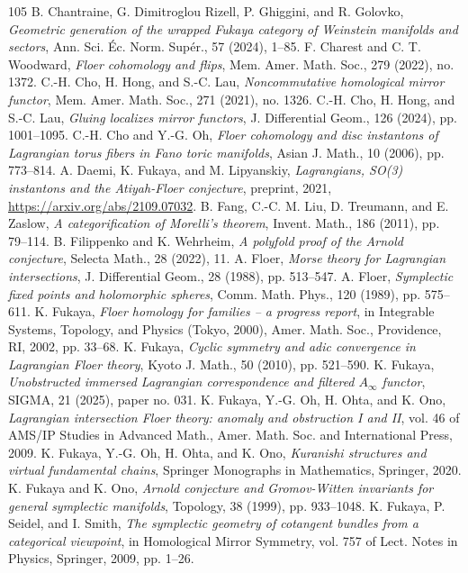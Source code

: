 \documentclass[UTF8,a4paper,11pt,fontset=windows]{ctexart}
\theoremstyle{cnthm}
\numberwithin{equation}{section}
\begin{document}
\begin{thebibliography}{105}
 B. Chantraine, G. Dimitroglou Rizell, P. Ghiggini, and R. Golovko, \emph{Geometric generation of the wrapped Fukaya category of Weinstein manifolds and sectors}, Ann. Sci. \'Ec. Norm. Sup\'er., 57 (2024), 1--85.
 F. Charest and C. T. Woodward, \emph{Floer cohomology and flips}, Mem. Amer. Math. Soc., 279 (2022), no. 1372.
 C.-H. Cho, H. Hong, and S.-C. Lau, \emph{Noncommutative homological mirror functor}, Mem. Amer. Math. Soc., 271 (2021), no. 1326.
 C.-H. Cho, H. Hong, and S.-C. Lau, \emph{Gluing localizes mirror functors}, J. Differential Geom., 126 (2024), pp. 1001--1095.
 C.-H. Cho and Y.-G. Oh, \emph{Floer cohomology and disc instantons of Lagrangian torus fibers in Fano toric manifolds}, Asian J. Math., 10 (2006), pp. 773--814.
 A. Daemi, K. Fukaya, and M. Lipyanskiy, \emph{Lagrangians, SO(3) instantons and the Atiyah-Floer conjecture}, preprint, 2021, \url{https://arxiv.org/abs/2109.07032}.
 B. Fang, C.-C. M. Liu, D. Treumann, and E. Zaslow, \emph{A categorification of Morelli's theorem}, Invent. Math., 186 (2011), pp. 79--114.
 B. Filippenko and K. Wehrheim, \emph{A polyfold proof of the Arnold conjecture}, Selecta Math., 28 (2022), 11.
 A. Floer, \emph{Morse theory for Lagrangian intersections}, J. Differential Geom., 28 (1988), pp. 513--547.
 A. Floer, \emph{Symplectic fixed points and holomorphic spheres}, Comm. Math. Phys., 120 (1989), pp. 575--611.
 K. Fukaya, \emph{Floer homology for families -- a progress report}, in Integrable Systems, Topology, and Physics (Tokyo, 2000), Amer. Math. Soc., Providence, RI, 2002, pp. 33--68.
 K. Fukaya, \emph{Cyclic symmetry and adic convergence in Lagrangian Floer theory}, Kyoto J. Math., 50 (2010), pp. 521--590.
 K. Fukaya, \emph{Unobstructed immersed Lagrangian correspondence and filtered $A_\infty$ functor}, SIGMA, 21 (2025), paper no. 031.
 K. Fukaya, Y.-G. Oh, H. Ohta, and K. Ono, \emph{Lagrangian intersection Floer theory: anomaly and obstruction I and II}, vol. 46 of AMS/IP Studies in Advanced Math., Amer. Math. Soc. and International Press, 2009.
 K. Fukaya, Y.-G. Oh, H. Ohta, and K. Ono, \emph{Kuranishi structures and virtual fundamental chains}, Springer Monographs in Mathematics, Springer, 2020.
 K. Fukaya and K. Ono, \emph{Arnold conjecture and Gromov-Witten invariants for general symplectic manifolds}, Topology, 38 (1999), pp. 933--1048.
 K. Fukaya, P. Seidel, and I. Smith, \emph{The symplectic geometry of cotangent bundles from a categorical viewpoint}, in Homological Mirror Symmetry, vol. 757 of Lect. Notes in Physics, Springer, 2009, pp. 1--26.

\end{thebibliography}
\end{document}
